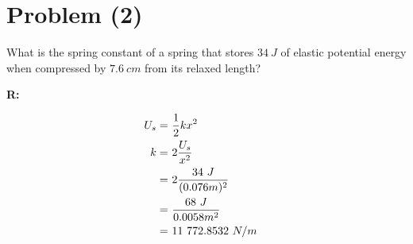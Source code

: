 \section{Problem (2)}

	What is the spring constant of a spring that stores $34 \ J$ of elastic potential energy when compressed by $7.6 \ cm$ from its relaxed length?

	\textbf{R:}

	\begin{align}
		U_{s} = \ &\frac{1}{2}kx^{2}& \notag \\
		k = \ &2\frac{U_{s}}{x^{2}}& \notag \\
		= \ &2\frac{34 \ J}{(0.076 m)^{2}}& \notag \\
		= \ &\frac{68 \ J}{0.0058 m^{2}}& \notag \\
		= \ &11 \ 772.8532 \ N/m&
	\end{align}
